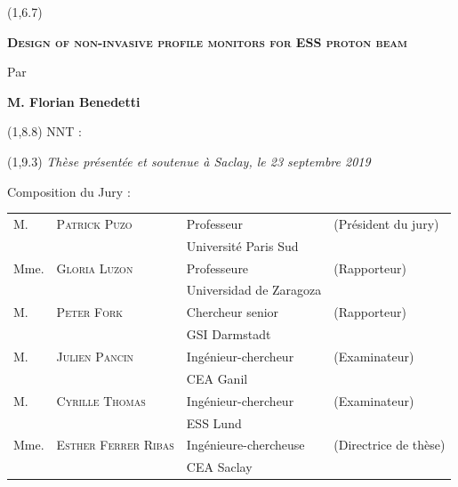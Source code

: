 \begin{titlepage}
	\begin{textblock}{14}(1,6.7)
		\begin{center}	
      \Large \textsc{\textcolor{ESSColor}{ \textbf{Design of non-invasive profile monitors for ESS proton beam}}}\par          
			\large Par\par  \large \textbf{M. Florian Benedetti} \par
		\end{center}
	\end{textblock}
	
	\begin{textblock}{13}(1,8.8)
		NNT : 
	\end{textblock}
	
	\begin{textblock}{14}(1,9.3)
		\vspace{1.5cm}
		\hspace{1cm}\textit{Thèse présentée et soutenue à Saclay, le 23 septembre 2019}
		\vspace{0.5cm}
		\par
		\hspace{1cm}Composition du Jury :
		\begin{center}
			\begin{tabular}{llll}
				M.    & \textsc{Patrick Puzo}        & Professeur              & (Président du jury)    \\
				\null & \null                        & Université Paris Sud    &                        \\   
				
				Mme.  & \textsc{Gloria Luzon}        & Professeure             & (Rapporteur)           \\
				\null & \null                        & Universidad de Zaragoza &                        \\ 
				
				M.    & \textsc{Peter Fork}          & Chercheur senior        & (Rapporteur)           \\
				\null & \null                        & GSI Darmstadt           &                        \\ 
				M.    & \textsc{Julien Pancin}       & Ingénieur-chercheur     & (Examinateur)          \\
				\null & \null                        & CEA Ganil               &                        \\
				M.    & \textsc{Cyrille Thomas}      & Ingénieur-chercheur     & (Examinateur)          \\
				\null & \null                        & ESS Lund                &                        \\ 				
				Mme.  & \textsc{Esther Ferrer Ribas} & Ingénieure-chercheuse   & (Directrice de thèse)  \\
				\null & \null                        & CEA Saclay              &                        \\ 
				

\end{tabular}
\end{center}
\end{textblock}
\end{titlepage}
